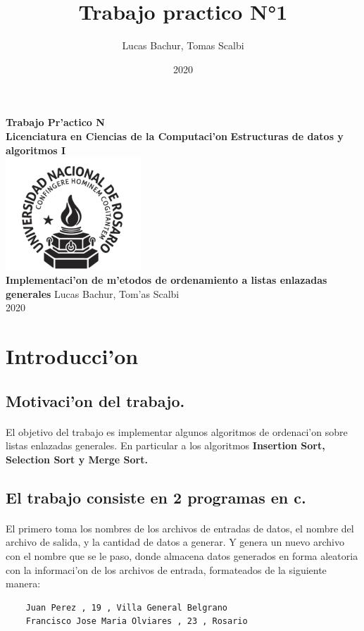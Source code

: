 \documentclass{article}
\title{Trabajo practico N°1}
\author{Lucas Bachur, Tomas Scalbi}
\date{2020}
\begin{document}
	
	\thispagestyle{empty}
	\begin{center}
		\Huge
		\textbf{Trabajo Pr'actico N}\\
		\LARGE
		\vfill
		\textbf{Licenciatura en Ciencias de la Computaci'on}
		\vfill
		\textbf{Estructuras de datos y algoritmos I} \\
		\vfill
		\includegraphics[width=2in]{UNRlogo.png} \\
		\vfill
		\textbf{Implementaci'on de m'etodos de ordenamiento a listas enlazadas generales}
		\vfill
		Lucas Bachur, Tom'as Scalbi \\
		2020 \\
	\end{center}
	\pagebreak
	
	\tableofcontents
	
	\pagebreak
	\section{Introducci'on}
	\subsection{Motivaci'on del trabajo.}
	\paragraph{}
	El objetivo del trabajo es implementar algunos algoritmos de ordenaci'on sobre listas enlazadas generales. En particular a los algoritmos \textbf{Insertion Sort, Selection Sort y Merge Sort.}\\
	\subsection{El trabajo consiste en 2 programas en c.}
	\paragraph{}
	El primero toma los nombres de los archivos de entradas de datos, el nombre del archivo de salida, y la cantidad de datos a generar. Y genera un nuevo archivo con el nombre que se le paso, donde almacena datos generados en forma aleatoria con la informaci'on de los archivos de entrada, formateados de la siguiente manera:
	\begin{verbatim}
	Juan Perez , 19 , Villa General Belgrano 
	Francisco Jose Maria Olviares , 23 , Rosario
	\end{verbatim}
\end{document}
